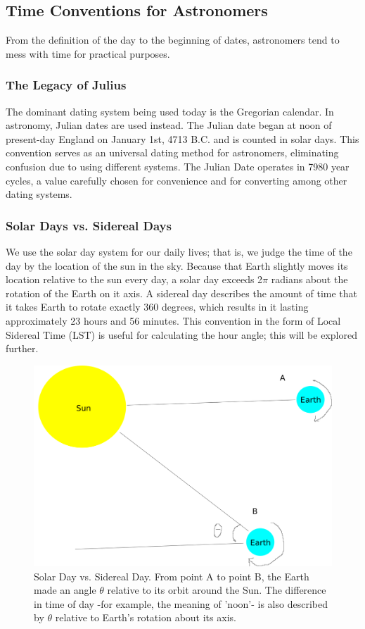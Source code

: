 \documentclass{article}
\begin{document}
\subsection{Time Conventions for Astronomers}
From the definition of the day to the beginning of dates, astronomers
tend to mess with time for practical purposes.
\subsubsection{The Legacy of Julius}
The dominant dating system being used today is the Gregorian
calendar. In astronomy, Julian dates are used instead. The Julian date
began at noon of present-day England on January 1st, 4713 B.C. and is
counted in solar days. This convention serves as an universal dating
method for astronomers, eliminating confusion due to using different
systems. The Julian Date operates in 7980 year cycles, a value carefully
chosen for convenience and for converting among other dating systems. 
\subsubsection{Solar Days vs. Sidereal Days}
We use the solar day system for our daily lives; that is, we judge the
time of the day by the location of the sun in the sky. Because that
Earth slightly moves its location relative to the sun every day, a solar
day exceeds 2$\pi$ radians about the rotation of the Earth on it axis. A 
sidereal day describes the amount of time that it takes Earth to rotate 
exactly 360 degrees, which results in it lasting approximately 23 hours
and 56 minutes. This convention in the form of Local Sidereal Time (LST)
is useful for calculating the hour angle; this will be explored further.
\begin{figure}[!h]
\centering
\includegraphics[width=.65\textwidth]{sidereal.png}
\caption{Solar Day vs. Sidereal Day. From point A to point B, the Earth
  made an angle $\theta$ relative to its orbit around the Sun. The
  difference in time of day -for example, the meaning of 'noon'- is also 
described by $\theta$ relative to Earth's rotation about its axis.}
\end{figure}
\end{document}
